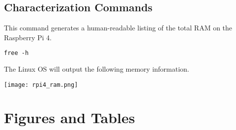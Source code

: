 \documentclass[journal]{IEEEtran}
\begin{document}
\begin{enumerate}
    \subsection{Characterization Commands}

    This command generates a human-readable listing of the total RAM on the Raspberry Pi 4.
    \begin{lstlisting}[frame=single]
        free -h
    \end{lstlisting}


    The Linux OS will output the following memory information. \newline
    
    \texttt{[image: rpi4\_ram.png]}

    \end{enumerate}
    \section{Figures and Tables}
\end{document}
